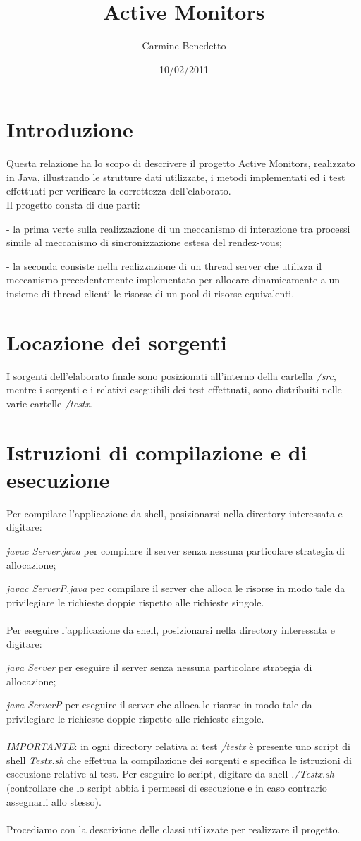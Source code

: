 \documentclass[10pt, a4paper]{article}
\title{Active Monitors}
\date{10/02/2011}
\author{Carmine Benedetto}
\begin{document}
\maketitle
\section{Introduzione}
Questa relazione ha lo scopo di descrivere il progetto Active Monitors, realizzato in Java, illustrando le strutture dati utilizzate, i metodi implementati ed i test effettuati per verificare la correttezza dell'elaborato.\\
Il progetto consta di due parti:

- la prima verte sulla realizzazione di un meccanismo di interazione tra processi simile al meccanismo di sincronizzazione estesa del rendez-vous;

- la seconda consiste nella realizzazione di un thread server che utilizza il meccanismo precedentemente implementato per allocare dinamicamente a un insieme di thread clienti le risorse di un pool di risorse equivalenti.
\section{Locazione dei sorgenti}
I sorgenti dell'elaborato finale sono posizionati all'interno della cartella \textit{/src}, mentre i sorgenti e i relativi eseguibili dei test effettuati, sono distribuiti nelle varie cartelle \textit{/testx}.
\section{Istruzioni di compilazione e di esecuzione}
Per compilare l'applicazione da shell, posizionarsi nella directory interessata e digitare:

\textit{javac Server.java} per compilare il server senza nessuna particolare strategia di allocazione;

\textit{javac ServerP.java} per compilare il server che alloca le risorse in modo tale da privilegiare le richieste doppie rispetto alle richieste singole.
\\\\
Per eseguire l'applicazione da shell, posizionarsi nella directory interessata e digitare:

\textit{java Server} per eseguire il server senza nessuna particolare strategia di allocazione; 

\textit{java ServerP} per eseguire il server che alloca le risorse in modo tale da privilegiare le richieste doppie rispetto alle richieste singole.
\\\\
\textit{IMPORTANTE}: in ogni directory relativa ai test \textit{/testx} è presente uno script di shell \textit{Testx.sh} che effettua la compilazione dei sorgenti e specifica le istruzioni di esecuzione relative al test. Per eseguire lo script, digitare da shell \textit{./Testx.sh} (controllare che lo script abbia i permessi di esecuzione e in caso contrario assegnarli allo stesso).
\\\\
Procediamo con la descrizione delle classi utilizzate per realizzare il progetto.
\end{document}
